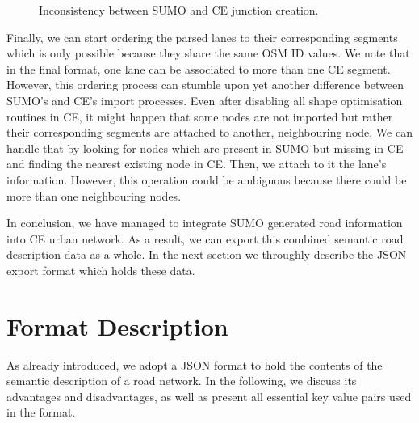 \begin{figure}[htb]
	\centering
	\caption{Inconsistency between SUMO and CE junction creation.}
\end{figure}

Finally, we can start ordering the parsed lanes to their corresponding segments which is only possible because they share the same OSM ID values. We note that in the final format, one lane can be associated to more than one CE segment. However, this ordering process can stumble upon yet another difference between SUMO's and CE's import processes. Even after disabling all shape optimisation routines in CE, it might happen that some nodes are not imported but rather their corresponding segments are attached to another, neighbouring node. We can handle that by looking for nodes which are present in SUMO but missing in CE and finding the nearest existing node in CE. Then, we attach to it the lane's information. However, this operation could be ambiguous because there could be more than one neighbouring nodes. 

In conclusion, we have managed to integrate SUMO generated road information into CE urban network. As a result, we can export this combined semantic road description data as a whole. In the next section we throughly describe the JSON export format which holds these data.

\section{Format Description}
\label{sec:format}
As already introduced, we adopt a JSON format to hold the contents of the semantic description of a road network. In the following, we discuss its advantages and disadvantages, as well as present all essential key value pairs used in the format.

